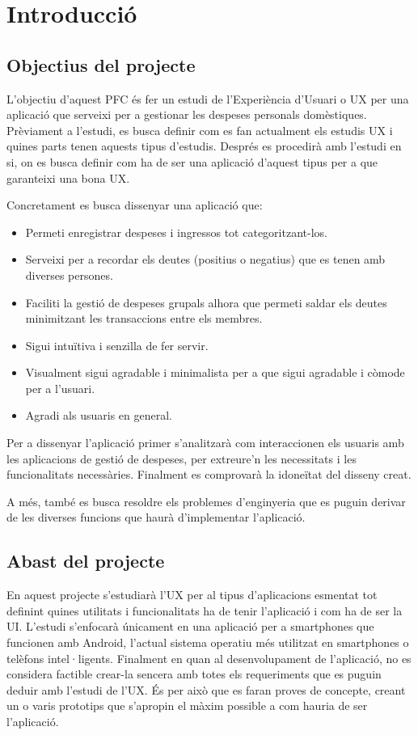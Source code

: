 \chapter{Introducció}

\section{Objectius del projecte}
L'objectiu d'aquest \ac{PFC} és fer un estudi de l'Experiència d'Usuari o \ac{UX} per una aplicació que serveixi per a gestionar les despeses personals domèstiques. Prèviament a l'estudi, es busca definir com es fan actualment els estudis \ac{UX} i quines parts tenen aquests tipus d'estudis. Després es procedirà amb l'estudi en si, on es busca definir com ha de ser una aplicació d'aquest tipus per a que garanteixi una bona \ac{UX}.

Concretament es busca dissenyar una aplicació que:
\begin{itemize}
\item Permeti enregistrar despeses i ingressos tot categoritzant-los.
\item Serveixi per a recordar els deutes (positius o negatius) que es tenen amb diverses persones.
\item Faciliti la gestió de despeses grupals alhora que permeti saldar els deutes minimitzant les transaccions entre els membres.
\item Sigui intuïtiva i senzilla de fer servir.
\item Visualment sigui agradable i minimalista per a que sigui agradable i còmode per a l'usuari.
\item Agradi als usuaris en general.
\end{itemize}

Per a dissenyar l'aplicació primer s'analitzarà com interaccionen els usuaris amb les aplicacions de gestió de despeses, per extreure'n les necessitats i les funcionalitats necessàries. Finalment es comprovarà la idoneïtat del disseny creat.

A més, també es busca resoldre els problemes d'enginyeria que es puguin derivar de les diverses funcions que haurà d'implementar l'aplicació. 

\section{Abast del projecte}
En aquest projecte s'estudiarà l'\ac{UX} per al tipus d'aplicacions esmentat tot definint quines utilitats i funcionalitats ha de tenir l'aplicació i com ha de ser la \ac{UI}. L'estudi s'enfocarà únicament en una aplicació per a \glspl{smartphone} que funcionen amb \gls{Android}, l'actual sistema operatiu més utilitzat\cite{Android_OS} en \glspl{smartphone} o telèfons intel·ligents. 
Finalment en quan al desenvolupament de l'aplicació, no es considera factible crear-la sencera amb totes els requeriments que es puguin deduir amb l'estudi de l'\ac{UX}. És per això que es faran proves de concepte, creant un o varis prototips que s'apropin el màxim possible a com hauria de ser l'aplicació. 